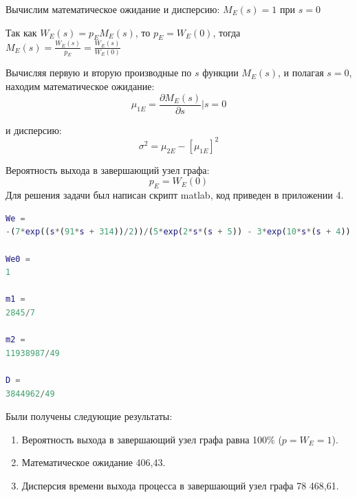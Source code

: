 Вычислим математическое ожидание и дисперсию: $M_E(s) = 1$ при $s=0$

Так как $W_E(s)=p_E M_E (s)$,  то  $p_E=W_E(0)$, тогда $M_E(s)=\frac{W_E(s)}{p_E} =\frac{W_E(s)}{W_E(0)}$

Вычисляя первую и вторую производные по $s$ функции $M_E(s)$, и полагая $s=0$, находим математическое ожидание:
\begin{equation*}
\mu_{1E}=\frac{\partial M_E(s)}{\partial s}|s=0
\end{equation*}

и дисперсию:
\begin{equation*}
\sigma^2=\mu_{2E}-[\mu_{1E}]^2
\end{equation*}

Вероятность выхода в завершающий узел графа:
\begin{equation*}
p_E=W_E (0)
\end{equation*}
Для решения задачи был написан скрипт matlab, код приведен в приложении 4.

\begin{lstlisting}[language={matlab}, caption={Результат}, basicstyle=\ttfamily]
We =
-(7*exp((s*(91*s + 314))/2))/(5*exp(2*s*(s + 5)) - 3*exp(10*s*(s + 4)) + 30*exp(2*s*(4*s + 15)) - exp((3*s*(15*s + 52))/2) + 10*exp((s*(41*s + 136))/2) + 2*exp((s*(91*s + 314))/2) - 50)
 
We0 =
1
 
m1 =
2845/7
 
m2 =
11938987/49
 
D =
3844962/49
\end{lstlisting}
Были получены следующие результаты:
\begin{enumerate}
\item Вероятность выхода в завершающий узел графа равна 100\% ($p=W_E=1$).
\item Математическое ожидание 406,43.
\item Дисперсия времени выхода процесса в завершающий узел графа 78 468,61.
\end{enumerate}
